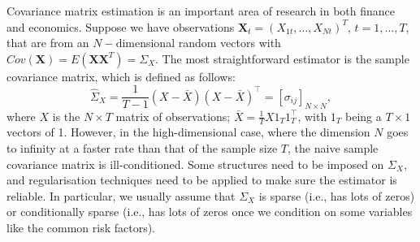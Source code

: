 Covariance matrix estimation is an important area of research in both finance and economics. Suppose we have observations $\mathbf{X}_{t}=(X_{1t},\dots,X_{Nt})^T$, $t=1,\dots,T$, that are from an $N-$dimensional random vectors with $Cov(\mathbf{X})=E(\mathbf{X}\mathbf{X}^T)={\Sigma}_{X}$. The most straightforward estimator is the sample covariance matrix, which is defined as follows:
\begin{equation}
{\hat{\Sigma}_{X}}=\frac{1}{T-1}({X}-\bar{{X}})({X}-\bar{{X}})^{\intercal}=[\sigma_{ij}]_{N\times N},
\end{equation}
where ${X}$ is the $N\times T$ matrix of observations; $\bar{{X}}=\frac{1}{T}{X}{1}_{T}{1}^{\intercal}_{T}$, with ${1}_{T}$ being a $T\times 1$ vectors of 1. However, in the high-dimensional case, where the dimension $N$ goes to infinity at a faster rate than that of the sample size $T$, the naive sample covariance matrix is ill-conditioned. Some structures need to be imposed on ${\Sigma}_{X}$, and regularisation techniques need to be applied to make sure the estimator is reliable. In particular, we usually assume that ${\Sigma}_{X}$ is sparse (i.e., has lots of zeros) or conditionally sparse (i.e., has lots of zeros once we condition on some variables like the common risk factors).

